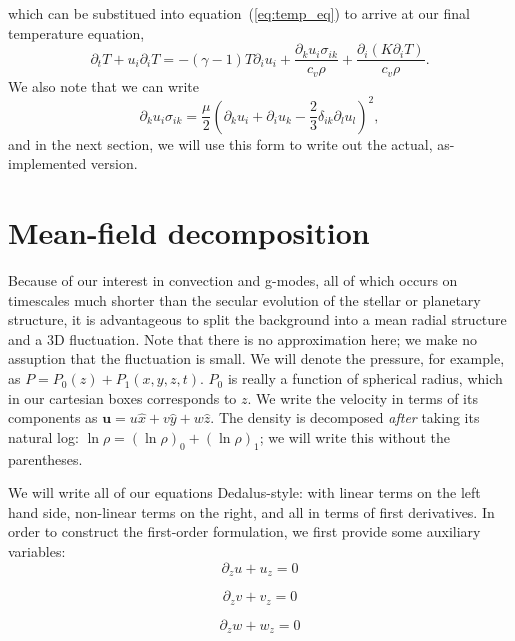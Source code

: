 \documentclass[letterpaper,12pt]{paper}
\newcommand{\lnrho}{\ensuremath{\ln \rho}}
\begin{document}
which can be substitued into equation~(\ref{eq:temp_eq}) to arrive at
our final temperature equation,
\begin{equation}
  \label{eq:final_temperature}
    \partial_t T + u_i \partial_i T  = -(\gamma - 1) T \partial_i
    u_i + \frac{\partial_k u_i \sigma_{ik}}{c_v \rho}
  + \frac{\partial_i (K \partial_i T)}{c_v \rho}.
\end{equation}
We also note that we can write
\begin{equation}
  \label{eq:square_sigma}
  \partial_k u_i \sigma_{ik} = \frac{\mu}{2} \left(\partial_k u_i
    + \partial_i u_k - \frac{2}{3} \delta_{ik} \partial_l u_l
  \right)^2,
\end{equation}
and in the next section, we will use this form to write out the
actual, as-implemented version.

\section{Mean-field decomposition}
\label{sec:meanfield}
Because of our interest in convection and g-modes, all of which occurs
on timescales much shorter than the secular evolution of the stellar
or planetary structure, it is advantageous to split the background
into a mean radial structure and a 3D fluctuation. Note that there is
no approximation here; we make no assuption that the fluctuation is
small. We will denote the pressure, for example, as
$P = P_0(z) + P_1(x,y,z,t)$. $P_0$ is really a function of spherical
radius, which in our cartesian boxes corresponds to $z$. We write the
velocity in terms of its components as
$\mathbf{u} = u \hat{x} + v \hat{y} + w \hat{z}$. The density is
decomposed \emph{after} taking its natural log:
$\lnrho = (\lnrho)_0 + (\lnrho)_1$; we will write this without
the parentheses.

We will write all of our equations Dedalus-style: with linear terms on
the left hand side, non-linear terms on the right, and all in terms of
first derivatives. In order to construct the first-order formulation,
we first provide some auxiliary variables:
\begin{equation}
  \label{eq:aux_u}
  \partial_z u + u_z = 0
\end{equation}

\begin{equation}
  \label{eq:aux_v}
  \partial_z v + v_z = 0
\end{equation}

\begin{equation}
  \label{eq:aux_w}
  \partial_z w + w_z = 0
\end{equation}
\end{document}
